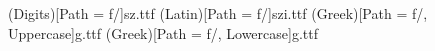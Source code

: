 \usepackage{mathspec}

\setmainfont[
	Path = f/,
	BoldFont=szb.ttf,
	ItalicFont=szi.ttf,
	BoldItalicFont=szbi.ttf
		]{sz.ttf}
		
\setmathfont(Digits)[Path = f/]{sz.ttf}
\setmathfont(Latin)[Path = f/]{szi.ttf}
\setmathfont(Greek)[Path = f/, Uppercase]{g.ttf}
\setmathfont(Greek)[Path = f/, Lowercase]{g.ttf}

\setmonofont[Path= f/]{pmono.ttf}
